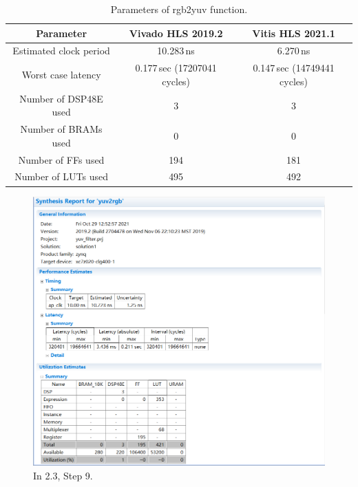 \documentclass[a4paper]{article}
\begin{document}
\begin{table}[H]
    \centering
    \begin{tabular}{|c|c|c|}
        \hline
        Parameter&Vivado HLS 2019.2&Vitis HLS 2021.1\\
        \hline
        Estimated clock period&10.283\,ns&6.270\,ns\\
        \hline
        Worst case latency&0.177\,sec (17207041 cycles)&0.147\,sec (14749441 cycles)\\
        \hline
        Number of DSP48E used&3&3\\
        \hline
        Number of BRAMs used&0&0\\
        \hline
        Number of FFs used&194&181\\
        \hline
        Number of LUTs used&495&492\\
        \hline
    \end{tabular}
    \caption{Parameters of rgb2yuv function.}
\end{table}


\begin{figure}[H]
    \centering
    \includegraphics[width=1\textwidth]{3.png}
    \caption{In 2.3, Step 9.}
\end{figure}
\end{document}
